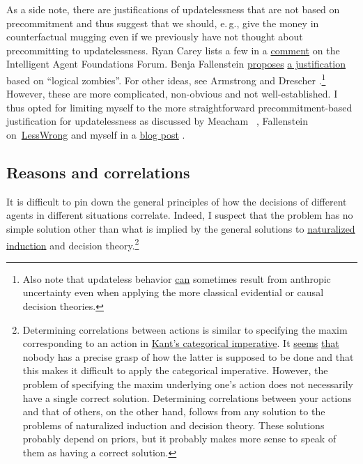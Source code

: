 As a side note, there are justifications of updatelessness that are not
based on precommitment and thus suggest that we should, e.\,g., give the
money in counterfactual mugging even if we previously have not thought
about precommitting to updatelessness. Ryan Carey lists a few in a
\href{https://agentfoundations.org/item?id=1199}{comment} on the
Intelligent Agent Foundations Forum. Benja Fallenstein
\href{http://lesswrong.com/lw/jkm/lzombies_lzombies/}{proposes}
\href{http://lesswrong.com/lw/jpr/sudt_a_toy_decision_theory_for_updateless/}{a
justification} based on ``logical zombies''. For other ideas, see
Armstrong \citeyear{Armstrong2011-sz} and
Drescher \citeyear{Drescher2006-ky}.\footnote{Also note that
  updateless behavior
  \href{https://casparoesterheld.com/2017/05/12/anthropic-uncertainty-in-the-evidential-blackmail/}{can}
  sometimes result from anthropic uncertainty even when applying the
  more classical evidential or causal decision theories.} However, these
are more complicated, non-obvious and not well-established. I thus opted
for limiting myself to the more straightforward precommitment-based
justification for updatelessness as discussed by Meacham~
\citeyear{Meacham2010-pk}, Fallenstein on~\href{http://lesswrong.com/lw/22m/selfmodification_is_the_correct_justification_for/}{LessWrong} and myself in a
\href{https://casparoesterheld.com/2016/11/21/thoughts-on-updatelessnes/}{blog post}
\parencite{Ahmed2012-ue}.

\hypertarget{reasons-and-correlations}{\subsection{Reasons and
correlations }\label{reasons-and-correlations}}

It is difficult to pin down the general principles of how the decisions
of different agents in different situations correlate. Indeed, I suspect
that the problem has no simple solution other than what is implied by
the general solutions to
\href{https://wiki.lesswrong.com/wiki/Naturalized_induction}{naturalized
induction} \parencite{Soares2014-hg,Soares2015-hu} and
decision theory.\footnote{Determining correlations between actions is
  similar to specifying the maxim corresponding to an action in
  \href{https://en.wikipedia.org/wiki/Categorical_imperative}{Kant's
  categorical imperative}. It
  \href{http://briantomasik.com/interpreting-the-categorical-imperative/\#If_everyone_did_what}{seems}
  \href{https://welovephilosophy.com/2013/01/07/choosing-a-kantian-maxim/}{that}
  nobody has a precise grasp of how the latter is supposed to be done
  and that this makes it difficult to apply the categorical imperative.
  However, the problem of specifying the maxim underlying one's action
  does not necessarily have a single correct solution. Determining
  correlations between your actions and that of others, on the other
  hand, follows from any solution to the problems of naturalized
  induction and decision theory. These solutions probably depend on
  priors, but it probably makes more sense to speak of them as having a
  correct solution.}

